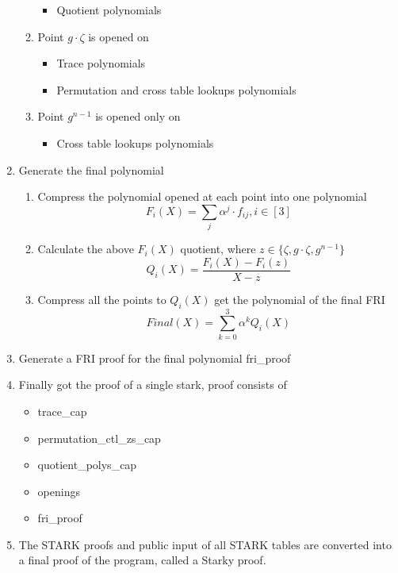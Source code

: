 \begin{enumerate}
\begin{enumerate}
\begin{itemize}
                \item Quotient polynomials
            \end{itemize}
        \item Point $g \cdot \zeta$ is opened on
            \begin{itemize}
                \item Trace polynomials
                \item Permutation and cross table lookups polynomials
            \end{itemize}
        \item Point $ g^{n-1} $ is opened only on
            \begin{itemize}
                \item Cross table lookups polynomials
            \end{itemize}
        \end{enumerate}
    \item Generate the final polynomial
        \begin{enumerate}
            \item Compress the polynomial opened at each point into one polynomial $$ F_i(X) = \sum_{j} \alpha^j \cdot f_{ij}, i \in [3] $$
            \item Calculate the above $ F_i(X) $ quotient, where $ z \in \{ \zeta, g \cdot \zeta, g^{n-1} \} $ $$ Q_i(X) = \frac{F_i(X) - F_i(z)}{X - z} $$
            \item Compress all the points to $ Q_i(X) $ get the polynomial of the final FRI $$ Final(X) = \sum_{k=0}^3 \alpha^k Q_i(X) $$
        \end{enumerate}
    \item Generate a FRI proof for the final polynomial fri\_proof
    \item Finally got the proof of a single stark, proof consists of
        \begin{itemize}
            \item trace\_cap
            \item permutation\_ctl\_zs\_cap
            \item quotient\_polys\_cap
            \item openings
            \item fri\_proof
        \end{itemize}
    \item The STARK proofs and public input of all STARK tables are converted into a final proof of the program, called a Starky proof.
\end{enumerate}

